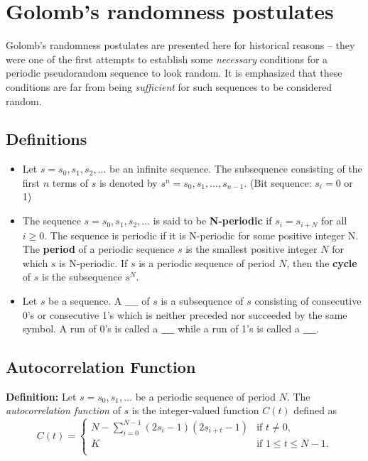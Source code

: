 \documentclass[12pt,openany]{book}
\theoremstyle{definition}
\begin{document}
	
	\section*{Golomb’s randomness postulates}
	
	Golomb’s randomness postulates are presented here for historical reasons – they were one of the first attempts to establish some \textit{necessary} conditions for a periodic pseudorandom sequence to look random. It is emphasized that these conditions are far from being \textit{sufficient} for such sequences to be considered random.
	
	\subsection*{Definitions}
	\begin{itemize}
		\item Let \( s = s_0, s_1, s_2, \ldots \) be an infinite sequence. The subsequence consisting of the first \( n \) terms of \( s \) is denoted by \( s^n = s_0, s_1, \ldots, s_{n-1} \). (Bit sequence: \( s_i = 0 \) or 1)
		\item The sequence \( s = s_0, s_1, s_2, \ldots \) is said to be \textbf{N-periodic} if \( s_i = s_{i+N} \) for all \( i \geq 0 \). The sequence is periodic if it is N-periodic for some positive integer N. The \textbf{period} of a periodic sequence \( s \) is the smallest positive integer \( N \) for which \( s \) is N-periodic. If \( s \) is a periodic sequence of period \( N \), then the \textbf{cycle} of \( s \) is the subsequence \( s^N \).
		\item Let \( s \) be a sequence. A \(\_\_\_\_\) of \( s \) is a subsequence of \( s \) consisting of consecutive 0’s or consecutive 1’s which is neither preceded nor succeeded by the same symbol. A run of 0’s is called a \(\_\_\_\_\) while a run of 1’s is called a \(\_\_\_\_\).
	\end{itemize}
	
	\subsection*{Autocorrelation Function}
	\textbf{Definition:} Let \( s = s_0, s_1, \ldots \) be a periodic sequence of period \( N \). The \textit{autocorrelation function} of \( s \) is the integer-valued function \( C(t) \) defined as
	\[ C(t) = \begin{cases} 
		N - \sum_{i=0}^{N-1} (2s_i - 1)(2s_{i+t} - 1) & \text{if } t \neq 0, \\
		K & \text{if } 1 \leq t \leq N - 1. \\
	\end{cases} \]
	
\end{document}
